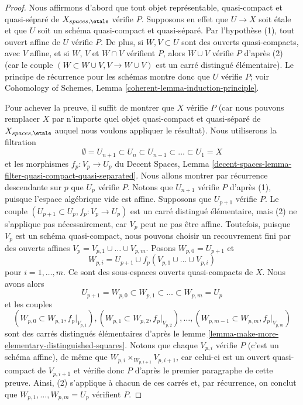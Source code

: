 \begin{proof}
Nous affirmons d'abord que tout objet représentable, quasi-compact et
quasi-séparé de $X_{spaces, \etale}$ v\'erifie $P$.
Supposons en effet que $U \to X$ soit étale et que $U$ soit un schéma
quasi-compact et quasi-séparé. Par l'hypothèse (1), tout ouvert affine de
$U$ v\'erifie $P$. De plus, si $W, V \subset U$ sont des ouverts
quasi-compacts, avec $V$ affine, et si $W$, $V$ et $W \cap V$ v\'erifient
$P$, alors $W \cup V$ v\'erifie $P$ d'après (2)
(car le couple $(W \subset W \cup V, V \to W \cup V)$ est un carré
distingué élémentaire). Le principe de récurrence pour les schémas montre donc
que $U$ v\'erifie $P$; voir
Cohomology of Schemes, Lemma \ref{coherent-lemma-induction-principle}.

\medskip\noindent
Pour achever la preuve, il suffit de montrer que $X$ v\'erifie $P$
(car nous pouvons remplacer $X$ par n'importe quel objet quasi-compact et quasi-séparé
de $X_{spaces, \etale}$ auquel nous voulons appliquer le résultat).
Nous utiliserons la filtration
$$
\emptyset = U_{n + 1} \subset
U_n \subset U_{n - 1} \subset \ldots \subset U_1 = X
$$
et les morphismes $f_p : V_p \to U_p$ du
Decent Spaces, Lemma
\ref{decent-spaces-lemma-filter-quasi-compact-quasi-separated}.
Nous allons montrer par récurrence descendante sur $p$ que $U_p$ v\'erifie
$P$. Notons que $U_{n + 1}$ v\'erifie $P$ d'après (1), puisque l'espace
algébrique vide est affine. Supposons que $U_{p + 1}$ v\'erifie $P$.
Le couple $(U_{p + 1} \subset U_p, f_p : V_p \to U_p)$ est un carré distingué
élémentaire, mais (2) ne s'applique pas nécessairement, car $V_p$ peut ne pas être affine.
Toutefois, puisque $V_p$ est un schéma quasi-compact, nous pouvons choisir un recouvrement
fini par des ouverts affines $V_p = V_{p, 1} \cup \ldots \cup V_{p, m}$.
Posons $W_{p, 0} = U_{p + 1}$ et
$$
W_{p, i} = U_{p + 1} \cup f_p(V_{p, 1} \cup \ldots \cup V_{p, i})
$$
pour $i = 1, \ldots, m$. Ce sont des sous-espaces ouverts quasi-compacts de $X$.
Nous avons alors
$$
U_{p + 1} = W_{p, 0} \subset
W_{p, 1} \subset \ldots \subset
W_{p, m} = U_p
$$
et les couples
$$
(W_{p, 0} \subset W_{p, 1}, f_p|_{V_{p, 1}}),
(W_{p, 1} \subset W_{p, 2}, f_p|_{V_{p, 2}}),\ldots,
(W_{p, m - 1} \subset W_{p, m}, f_p|_{V_{p, m}})
$$
sont des carrés distingués élémentaires d'après le
lemme \ref{lemma-make-more-elementary-distinguished-squares}.
Notons que chaque $V_{p, i}$ v\'erifie $P$ (c'est un schéma affine), de même
que $W_{p, i} \times_{W_{p, i + 1}} V_{p, i + 1}$, car celui-ci est un ouvert
quasi-compact de $V_{p, i + 1}$ et vérifie donc $P$ d'après le premier
paragraphe de cette preuve. Ainsi, (2) s'applique à chacun de ces carrés et,
par récurrence, on conclut que
$W_{p, 1}, \ldots, W_{p, m} = U_p$ vérifient $P$.
\end{proof}

